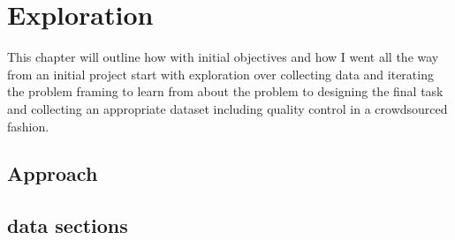 
\clearpage

\section{Exploration}
\label{sec:Exploration}

This chapter will outline how with initial objectives and how I went all the way from an initial project start with exploration over collecting data and iterating the problem framing to learn from about the problem to designing the final task and collecting an appropriate dataset including quality control in a crowdsourced fashion. 






\subsection{Approach}
\label{sub:Approach}

\subsection{data sections}
\label{sub:data sections}

%
%
%
%



